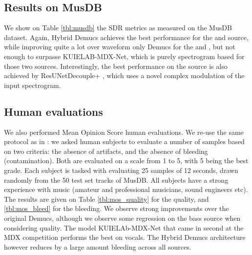 \documentclass[10pt,a4paper,onecolumn]{article}
\let\textttOrig=\texttt
\def\texttt#1{\expandafter\textttOrig{\seqsplit{#1}}}
\begin{document}
\hypertarget{results-on-musdb}{%
\subsection{Results on MusDB}\label{results-on-musdb}}

We show on Table \ref{tbl:musdb} the SDR metrics as measured on the
MusDB dataset. Again, Hybrid Demucs achieves the best performance for
the \texttt{Drums} and \texttt{Bass} source, while improving quite a lot
over waveform only Demucs for the \texttt{Other} and \texttt{Vocals},
but not enough to surpasse KUIELAB-MDX-Net, which is purely spectrogram
based for those two sources. Interestingly, the best performance on the
\texttt{Vocals} source is also achieved by ResUNetDecouple+
\citep{kong2021decoupling}, which uses a novel complex modulation of the
input spectrogram.

\hypertarget{human-evaluations}{%
\subsection{Human evaluations}\label{human-evaluations}}

We also performed Mean Opinion Score human evaluations. We re-use the
same protocol as in \citep{demucs}: we asked human subjects to evaluate
a number of samples based on two criteria: the absence of artifacts, and
the absence of bleeding (contamination). Both are evaluated on a scale
from 1 to 5, with 5 being the best grade. Each subject is tasked with
evaluating 25 samples of 12 seconds, drawn randomly from the 50 test set
tracks of MusDB. All subjects have a strong experience with music
(amateur and professional musicians, sound engineers etc). The results
are given on Table \ref{tbl:mos_quality} for the quality, and
\ref{tbl:mos_bleed} for the bleeding. We observe strong improvements
over the original Demucs, although we observe some regression on the
bass source when considering quality. The model KUIELAb-MDX-Net that
came in second at the MDX competition performs the best on vocals. The
Hybrid Demucs architecture however reduces by a large amount bleeding
across all sources.
\end{document}
